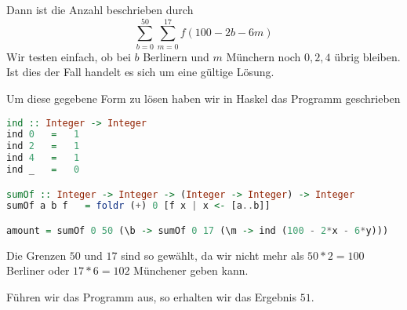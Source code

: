 \documentclass[11pt,a4paper,ngerman]{article}
\begin{document}
Dann ist die Anzahl beschrieben durch
$$
    \overset{50}{\underset{b=0}{\sum}} \overset{17}{\underset{m=0}{\sum}} f(100 - 2b - 6m)
$$
Wir testen einfach, ob bei $b$ Berlinern und $m$ Münchern noch $0,2,4$ übrig bleiben. Ist dies
der Fall handelt es sich um eine gültige Lösung.

Um diese gegebene Form zu lösen haben wir in Haskel das Programm geschrieben

\begin{lstlisting}[language=Haskell]
ind :: Integer -> Integer
ind 0   =   1
ind 2   =   1
ind 4   =   1
ind _   =   0

sumOf :: Integer -> Integer -> (Integer -> Integer) -> Integer
sumOf a b f   = foldr (+) 0 [f x | x <- [a..b]]

amount = sumOf 0 50 (\b -> sumOf 0 17 (\m -> ind (100 - 2*x - 6*y)))
\end{lstlisting}

Die Grenzen $50$ und $17$ sind so gewählt, da wir nicht mehr als $50*2 = 100$ Berliner oder
$17*6 = 102$ Münchener geben kann.

Führen wir das Programm aus, so erhalten wir das Ergebnis $51$.

\label{LastPage}
\end{document}
